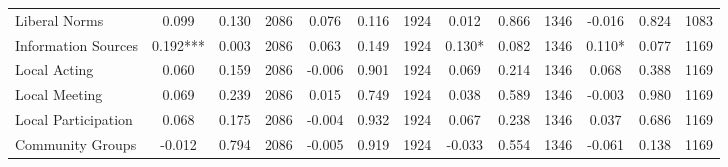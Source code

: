 \begin{tabular}{l*{12}{c}}
 Liberal Norms &        0.099 &        0.130 & 2086    &        0.076 &        0.116 & 1924    &        0.012 &        0.866 & 1346 &       -0.016 &        0.824 & 1083 \\ 

 Information Sources &        0.192*** &        0.003 & 2086    &        0.063 &        0.149 & 1924    &        0.130* &        0.082 & 1346 &        0.110* &        0.077 & 1169 \\ 

 Local Acting &        0.060 &        0.159 & 2086    &       -0.006 &        0.901 & 1924    &        0.069 &        0.214 & 1346 &        0.068 &        0.388 & 1169 \\ 

 Local Meeting &        0.069 &        0.239 & 2086    &        0.015 &        0.749 & 1924    &        0.038 &        0.589 & 1346 &       -0.003 &        0.980 & 1169 \\ 

 Local Participation &        0.068 &        0.175 & 2086    &       -0.004 &        0.932 & 1924    &        0.067 &        0.238 & 1346 &        0.037 &        0.686 & 1169 \\ 

 Community Groups &       -0.012 &        0.794 & 2086    &       -0.005 &        0.919 & 1924    &       -0.033 &        0.554 & 1346 &       -0.061 &        0.138 & 1169 \\ 

\hline \end{tabular}
